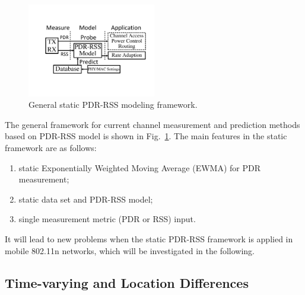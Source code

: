 \documentclass[draftclsnofoot,journal,onecolumn,11pt]{IEEEtran}
\begin{document}
\begin{figure}[!htp]
\centering
\includegraphics[width=0.5\textwidth]{modeling1.pdf}
\caption{General static PDR-RSS modeling framework.}
\label{offlinemodel}
\end{figure}

The general framework for current channel measurement and prediction methods based on PDR-RSS model is shown in Fig.~\ref{offlinemodel}. The main features in the static framework are as follows:
\begin{enumerate}
  \item static Exponentially Weighted Moving Average (EWMA) for PDR measurement;
  \item static data set and PDR-RSS model;
  \item single measurement metric (PDR or RSS) input.
\end{enumerate}
It will lead to new problems when the static PDR-RSS framework is applied in mobile 802.11n networks, which will be investigated in the following.

\subsection{Time-varying and Location Differences}
\end{document}
